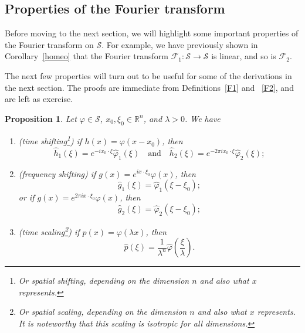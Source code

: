 \documentclass[12pt, letterpaper]{article}
\theoremstyle{plain}
\newtheorem{proposition}[theorem]{Proposition}
\renewcommand{\phi}{\varphi}
\begin{document}
\subsection{Properties of the Fourier transform}

Before moving to the next section, we will highlight some important properties of the Fourier transform on $\mathcal{S}$. For example, we have previously shown in Corollary~\ref{homeo} that the Fourier transform $\mathcal{F}_1:\mathcal{S} \to \mathcal{S}$ is linear, and so is $\mathcal{F}_2$.

The next few properties will turn out to be useful for some of the derivations in the next section. The proofs are immediate from Definitions~\ref{F1} and ~\ref{F2}, and are left as exercise.

\begin{proposition}\label{shifting}
    Let $\phi \in \mathcal{S}$, $x_0, \xi_0 \in \mathbb{R}^n$, and $\lambda > 0$. We have
    \begin{enumerate}
        \item (time shifting\footnote{Or spatial shifting, depending on the dimension $n$ and also what $x$ represents.}) if $h(x) = \phi(x - x_0)$, then 
        \begin{equation}\label{ts}
            \hat{h}_1(\xi) = e^{-i x_0 \cdot \xi} \hat{\phi}_1(\xi) \quad \text{and} \quad \hat{h}_2(\xi) = e^{-2\pi i x_0 \cdot \xi} \hat{\phi}_2(\xi);
        \end{equation}
        \item (frequency shifting) if $g(x) = e^{ix \cdot \xi_0} \phi(x)$, then 
        \begin{equation}
            \hat{g}_1(\xi) = \hat{\phi}_1(\xi - \xi_0);
        \end{equation}
        or if $g(x) = e^{2\pi i x \cdot \xi_0} \phi(x)$, then
        \begin{equation}\label{fs}
            \hat{g}_2(\xi) = \hat{\phi}_2(\xi - \xi_0);
        \end{equation}
        \item (time scaling\footnote{Or spatial scaling, depending on the dimension $n$ and also what $x$ represents. It is noteworthy that this scaling is \emph{isotropic} for all dimensions.}) if $p(x) = \phi(\lambda x)$, then
        \begin{equation}
            \hat{p}(\xi) = \frac{1}{\lambda^n}\hat{\phi} \left( \frac{\xi}{\lambda} \right).
        \end{equation}
    \end{enumerate}
\end{proposition}
\end{document}
